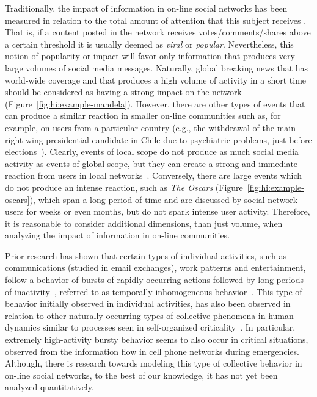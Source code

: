 Traditionally, the impact of information in on-line social networks has been
measured in relation to the total amount of attention that this subject receives
\cite{berger2012makes,iribarren2011branching,guerini2011exploring,mills2012virality,gaugaz2012predicting}.
%
That is, if a content posted in the network receives votes/comments/shares above
a certain threshold it is usually deemed as {\em viral} or {\em popular}.
%
Nevertheless, this notion of popularity or impact will favor only information
that produces very large volumes of social media messages. 
%
Naturally, global breaking news that has world-wide coverage and that produces a
high volume of activity in a short time should be considered as having a strong
impact on the network (Figure~\ref{fig:hi:example-mandela}).  
%
However, there are other types of events that can produce a similar reaction in
smaller on-line communities such as, for example, on users from a particular
country (e.g., the withdrawal of the main right wing presidential candidate in
Chile due to psychiatric problems, just before
elections~\cite{chile_elections}). 
%
Clearly, events of local scope do not produce as much social media activity as
events of global scope, but they can create a strong and immediate reaction from
users in local networks~\cite{ReisBOPKA15}. 
%
Conversely, there are large events which do not produce an intense reaction,
such as {\em The Oscars} (Figure~\ref{fig:hi:example-oscars}), which span a long
period of time and are discussed by social network users for weeks or even
months, but do not spark intense user activity. 
%
Therefore, it is reasonable to consider additional dimensions, than just volume,
when analyzing the impact of information in on-line communities.  

Prior research has shown that certain types of individual activities, such as
communications (studied in email exchanges), work patterns and entertainment,
follow a behavior of bursts of rapidly occurring actions followed by long
periods of inactivity~\cite{barabasi2005origin}, referred to as {temporally
inhomogeneous} behavior~\cite{karsai2012universal}.  
%
This type of behavior initially observed in individual activities, has also been
observed in relation to other naturally occurring types of collective phenomena
in human dynamics similar to processes seen in self-organized
criticality~\cite{karsai2012universal}.  
%
In particular, extremely high-activity bursty behavior seems to also occur in
critical situations, observed from the information flow in cell phone networks
during emergencies\cite{gao2014quantifying}.  
%
Although, there is research towards modeling this type of collective behavior
\cite{yan2013information} in on-line social networks, to the best of our
knowledge, it has not yet been analyzed quantitatively.





